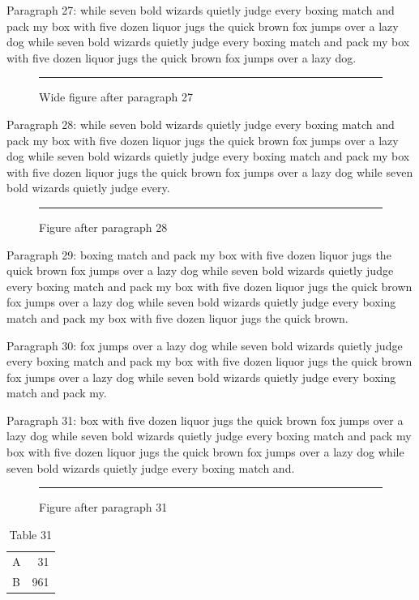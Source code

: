 \documentclass[twocolumn]{article}
\begin{document}
Paragraph 27: while seven bold wizards quietly judge every boxing match and pack my box with five dozen liquor jugs the quick brown fox jumps over a lazy dog while seven bold wizards quietly judge every boxing match and pack my box with five dozen liquor jugs the quick brown fox jumps over a lazy dog.

\begin{figure}[t]\centering\rule{0.7\textwidth}{9em}\caption{Wide figure after paragraph 27}\end{figure}
Paragraph 28: while seven bold wizards quietly judge every boxing match and pack my box with five dozen liquor jugs the quick brown fox jumps over a lazy dog while seven bold wizards quietly judge every boxing match and pack my box with five dozen liquor jugs the quick brown fox jumps over a lazy dog while seven bold wizards quietly judge every.

\begin{figure}[htbp]\centering\rule{0.8\columnwidth}{5em}\caption{Figure after paragraph 28}\end{figure}
Paragraph 29: boxing match and pack my box with five dozen liquor jugs the quick brown fox jumps over a lazy dog while seven bold wizards quietly judge every boxing match and pack my box with five dozen liquor jugs the quick brown fox jumps over a lazy dog while seven bold wizards quietly judge every boxing match and pack my box with five dozen liquor jugs the quick brown.

Paragraph 30: fox jumps over a lazy dog while seven bold wizards quietly judge every boxing match and pack my box with five dozen liquor jugs the quick brown fox jumps over a lazy dog while seven bold wizards quietly judge every boxing match and pack my.

Paragraph 31: box with five dozen liquor jugs the quick brown fox jumps over a lazy dog while seven bold wizards quietly judge every boxing match and pack my box with five dozen liquor jugs the quick brown fox jumps over a lazy dog while seven bold wizards quietly judge every boxing match and.

\begin{figure}[tbp]\centering\rule{0.8\columnwidth}{8em}\caption{Figure after paragraph 31}\end{figure}
\begin{table}[htb]\centering\begin{tabular}{lr}A & 31\\ B & 961\end{tabular}\caption{Table 31}\end{table}
\end{document}
